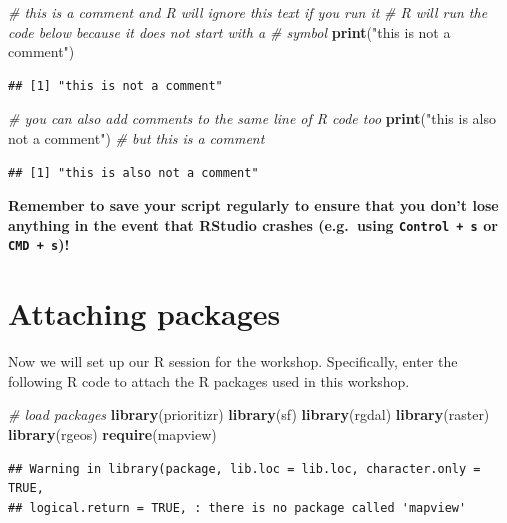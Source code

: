 \documentclass[12pt,]{book}
\newenvironment{Shaded}{\begin{snugshade}}{\end{snugshade}}
\newcommand{\KeywordTok}[1]{\textcolor[rgb]{0.13,0.29,0.53}{\textbf{#1}}}
\newcommand{\StringTok}[1]{\textcolor[rgb]{0.31,0.60,0.02}{#1}}
\newcommand{\CommentTok}[1]{\textcolor[rgb]{0.56,0.35,0.01}{\textit{#1}}}
\newcommand{\NormalTok}[1]{#1}
\begin{document}
\begin{Shaded}
\begin{Highlighting}[]
\CommentTok{# this is a comment and R will ignore this text if you run it}
\CommentTok{# R will run the code below because it does not start with a # symbol}
\KeywordTok{print}\NormalTok{(}\StringTok{"this is not a comment"}\NormalTok{)}
\end{Highlighting}
\end{Shaded}

\begin{verbatim}
## [1] "this is not a comment"
\end{verbatim}

\begin{Shaded}
\begin{Highlighting}[]
\CommentTok{# you can also add comments to the same line of R code too}
\KeywordTok{print}\NormalTok{(}\StringTok{"this is also not a comment"}\NormalTok{) }\CommentTok{# but this is a comment}
\end{Highlighting}
\end{Shaded}

\begin{verbatim}
## [1] "this is also not a comment"
\end{verbatim}

\textbf{Remember to save your script regularly to ensure that you don't
lose anything in the event that RStudio crashes (e.g.~using
\texttt{Control\ +\ s} or \texttt{CMD\ +\ s})!}

\section{Attaching packages}\label{attaching-packages}

Now we will set up our R session for the workshop. Specifically, enter
the following R code to attach the R packages used in this workshop.

\begin{Shaded}
\begin{Highlighting}[]
\CommentTok{# load packages}
\KeywordTok{library}\NormalTok{(prioritizr)}
\KeywordTok{library}\NormalTok{(sf)}
\KeywordTok{library}\NormalTok{(rgdal)}
\KeywordTok{library}\NormalTok{(raster)}
\KeywordTok{library}\NormalTok{(rgeos)}
\KeywordTok{require}\NormalTok{(mapview)}
\end{Highlighting}
\end{Shaded}

\begin{verbatim}
## Warning in library(package, lib.loc = lib.loc, character.only = TRUE,
## logical.return = TRUE, : there is no package called 'mapview'
\end{verbatim}
\end{document}

